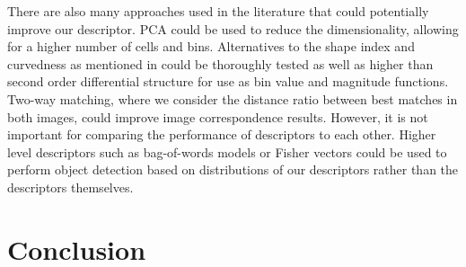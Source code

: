 \documentclass[thesis.tex]{subfiles}
\begin{document}
There are also many approaches used in the literature that could potentially improve our descriptor. PCA could be used to reduce the dimensionality, allowing for a higher number of cells and bins. Alternatives to the shape index and curvedness as mentioned in  could be thoroughly tested as well as higher than second order differential structure for use as bin value and magnitude functions. Two-way matching, where we consider the distance ratio between best matches in both images, could improve image correspondence results. However, it is not important for comparing the performance of descriptors to each other. Higher level descriptors such as bag-of-words models or Fisher vectors \cite{sanchez2013image} could be used to perform object detection based on distributions of our descriptors rather than the descriptors themselves.

\section{Conclusion}

\subbibliography
\end{document}
